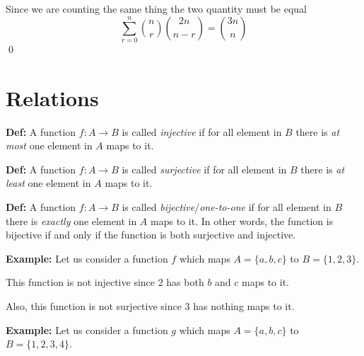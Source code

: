 \documentclass[a4paper, 12pt]{article}
\newcommand{\definition}{\vspace{1em}\noindent\textbf{Def:} }
\newcommand{\example}{\vspace{1em}\noindent\textbf{Example:} }
\begin{document}
\begin{multicols}{2}
	Since we are counting the same thing the two quantity must be equal
	\[
	\sum_{r=0}^{n} {n \choose r} {2n \choose n-r} = {3n \choose n}
	\]
	\qed

	\section*{Relations}
	
	\definition A function $f:A \to B$ is called \emph{injective} if for all element in $B$ there is \emph{at most} one element in $A$ maps to it.
	
	\definition A function $f:A \to B$ is called \emph{surjective} if for all element in $B$ there is \emph{at least} one element in $A$ maps to it.
	
	\definition A function $f:A \to B$ is called \emph{bijective}/\emph{one-to-one} if for all element in $B$ there is \emph{exactly} one element in $A$ maps to it. In other words, the function is bijective if and only if the function is both surjective and injective.
	
	\example Let us consider a function $f$ which maps $A = \{a,b,c\}$ to  $B=\{1,2,3\}$.
	\begin{center}
		
	\end{center}
	
	This function is not injective since $2$ has both $b$ and $c$ maps to it.
	
	Also, this function is not surjective since $3$ has nothing maps to it.
	
	\example Let us consider a function $g$ which maps $A = \{a,b,c\}$ to  $B=\{1,2,3,4\}$.
	\begin{center}
		

\end{center}
\end{multicols}
\end{document}
